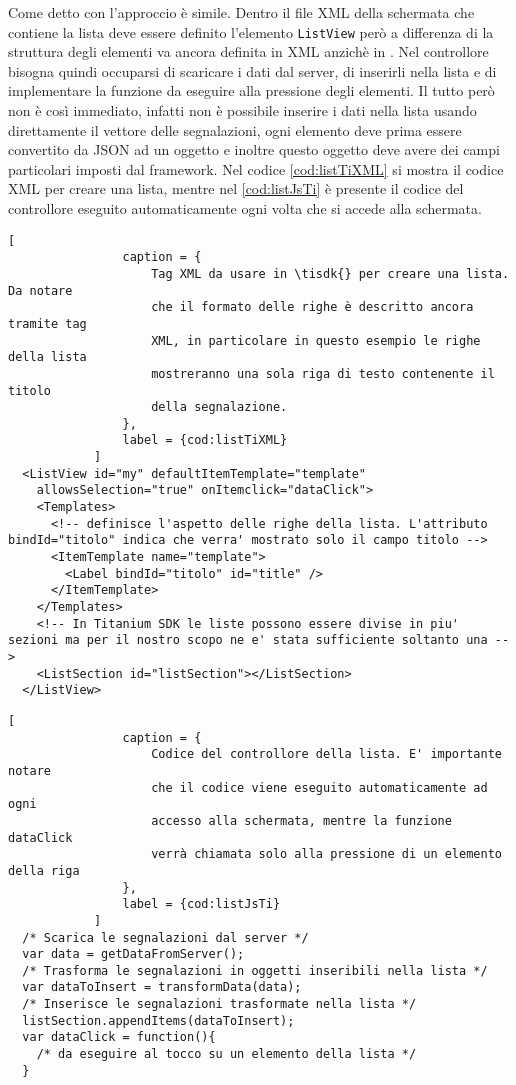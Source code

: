             Come detto con \tisdk{} l'approccio è simile. Dentro
            il file XML della schermata che contiene la lista deve essere definito
            l'elemento \texttt{ListView} però a differenza di \kendomob{} la struttura
            degli elementi va ancora definita in XML anzichè in \js{}. Nel controllore
            bisogna quindi occuparsi di scaricare i dati dal
            server, di inserirli nella lista e di implementare la funzione
            da eseguire alla pressione degli elementi. Il tutto però non è così immediato,
            infatti non è possibile inserire i dati nella lista usando direttamente
            il vettore delle segnalazioni, ogni elemento deve prima essere convertito
            da JSON ad un oggetto \js{} e inoltre questo oggetto deve avere dei
            campi particolari imposti dal framework. Nel codice \ref{cod:listTiXML} si mostra il
            codice XML per creare una lista, mentre nel \ref{cod:listJsTi} è presente il codice
            \js{} del controllore eseguito automaticamente ogni volta che si
            accede alla schermata.
            \begin{lstlisting}[
                caption = {
                    Tag XML da usare in \tisdk{} per creare una lista. Da notare
                    che il formato delle righe è descritto ancora tramite tag
                    XML, in particolare in questo esempio le righe della lista
                    mostreranno una sola riga di testo contenente il titolo
                    della segnalazione.
                },
                label = {cod:listTiXML}
            ]
  <ListView id="my" defaultItemTemplate="template"
    allowsSelection="true" onItemclick="dataClick">
    <Templates>
      <!-- definisce l'aspetto delle righe della lista. L'attributo bindId="titolo" indica che verra' mostrato solo il campo titolo -->
      <ItemTemplate name="template">
        <Label bindId="titolo" id="title" />
      </ItemTemplate>
    </Templates>
    <!-- In Titanium SDK le liste possono essere divise in piu' sezioni ma per il nostro scopo ne e' stata sufficiente soltanto una -->
    <ListSection id="listSection"></ListSection>
  </ListView>
            \end{lstlisting}
            \begin{lstlisting}[
                caption = {
                    Codice del controllore della lista. E' importante notare
                    che il codice viene eseguito automaticamente ad ogni
                    accesso alla schermata, mentre la funzione dataClick
                    verrà chiamata solo alla pressione di un elemento della riga
                },
                label = {cod:listJsTi}
            ]
  /* Scarica le segnalazioni dal server */
  var data = getDataFromServer();
  /* Trasforma le segnalazioni in oggetti inseribili nella lista */
  var dataToInsert = transformData(data);
  /* Inserisce le segnalazioni trasformate nella lista */
  listSection.appendItems(dataToInsert);
  var dataClick = function(){
    /* da eseguire al tocco su un elemento della lista */
  }
            \end{lstlisting}
